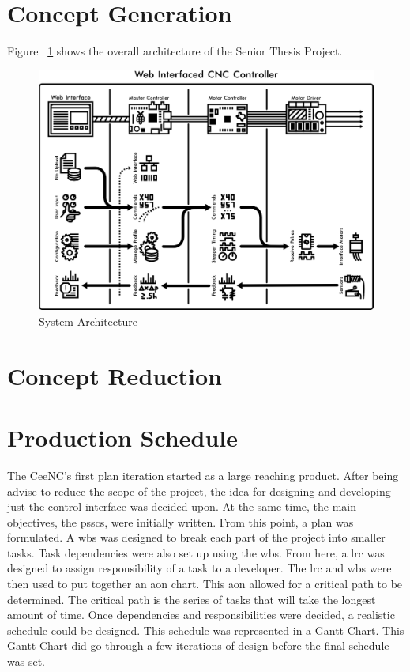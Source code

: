 
\section{Concept Generation}
Figure ~\ref{fig:architecture} shows the overall architecture of the Senior Thesis Project.

\begin{figure}[h]
	\centering
	\includegraphics[width=1\textwidth]{architecture.png}
	\caption{System Architecture}
	\label{fig:architecture}
\end{figure}

\section{Concept Reduction}
\section{Production Schedule}
The CeeNC's first plan iteration started as a large reaching product.
After being advise to reduce the scope of the project, the idea for designing and developing just the control interface was decided upon.
At the same time, the main objectives, the \gls{pssc}s, were initially written.
From this point, a plan was formulated.
A \gls{wbs} was designed to break each part of the project into smaller tasks.
Task dependencies were also set up using the \gls{wbs}. 
From here, a \gls{lrc} was designed to assign responsibility of a task to a developer.
The \gls{lrc} and \gls{wbs} were then used to put together an \gls{aon} chart.
This \gls{aon} allowed for a critical path to be determined. 
The critical path is the series of tasks that will take the longest amount of time.
Once dependencies and responsibilities were decided, a realistic schedule could be designed.
This schedule was represented in a Gantt Chart.
This Gantt Chart did go through a few iterations of design before the final schedule was set.

